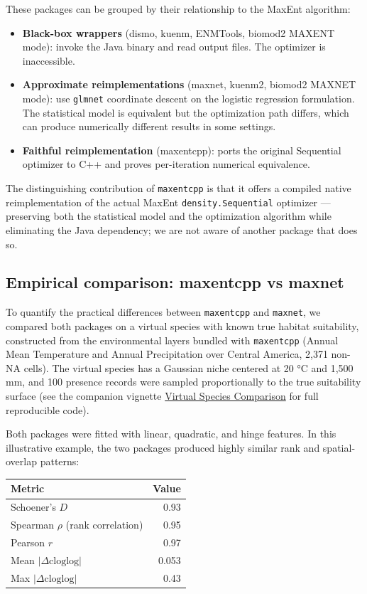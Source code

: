 \documentclass[10pt,letterpaper]{article}
\providecommand{\tightlist}{%
  \setlength{\itemsep}{0pt}\setlength{\parskip}{0pt}}
\begin{document}
These packages can be grouped by their relationship to the MaxEnt
algorithm:

\begin{itemize}
\tightlist
\item
  \textbf{Black-box wrappers} (dismo, kuenm, ENMTools, biomod2 MAXENT
  mode): invoke the Java binary and read output files. The optimizer is
  inaccessible.
\item
  \textbf{Approximate reimplementations} (maxnet, kuenm2, biomod2 MAXNET
  mode): use \texttt{glmnet} coordinate descent on the logistic
  regression formulation. The statistical model is equivalent but the
  optimization path differs, which can produce numerically different
  results in some settings.
\item
  \textbf{Faithful reimplementation} (maxentcpp): ports the original
  Sequential optimizer to C++ and proves per-iteration numerical
  equivalence.
\end{itemize}

The distinguishing contribution of \texttt{maxentcpp} is that it offers
a compiled native reimplementation of the actual MaxEnt
\texttt{density.Sequential} optimizer --- preserving both the
statistical model and the optimization algorithm while eliminating the
Java dependency; we are not aware of another package that does so.

\subsection*{Empirical comparison: maxentcpp vs
maxnet}

To quantify the practical differences between \texttt{maxentcpp} and
\texttt{maxnet}, we compared both packages on a virtual species
\cite{Leroy2016} with known true habitat suitability, constructed from
the environmental layers bundled with \texttt{maxentcpp} (Annual Mean
Temperature and Annual Precipitation over Central America, 2,371 non-NA
cells). The virtual species has a Gaussian niche centered at 20 °C and
1,500 mm, and 100 presence records were sampled proportionally to the
true suitability surface (see the companion vignette
\href{https://alrobles.github.io/maxentcpp/articles/virtual_species_comparison.html}{Virtual
Species Comparison} for full reproducible code).

Both packages were fitted with linear, quadratic, and hinge features. In
this illustrative example, the two packages produced highly similar rank
and spatial-overlap patterns:

\begin{longtable}[]{@{}lr@{}}
\toprule\noalign{}
Metric & Value \\
\midrule\noalign{}
\endhead
\bottomrule\noalign{}
\endlastfoot
Schoener's \(D\) \cite{Schoener1968,Warren2008} & 0.93 \\
Spearman \(\rho\) (rank correlation) & 0.95 \\
Pearson \(r\) & 0.97 \\
Mean \(\lvert\Delta\text{cloglog}\rvert\) & 0.053 \\
Max \(\lvert\Delta\text{cloglog}\rvert\) & 0.43 \\
\end{longtable}
\end{document}
